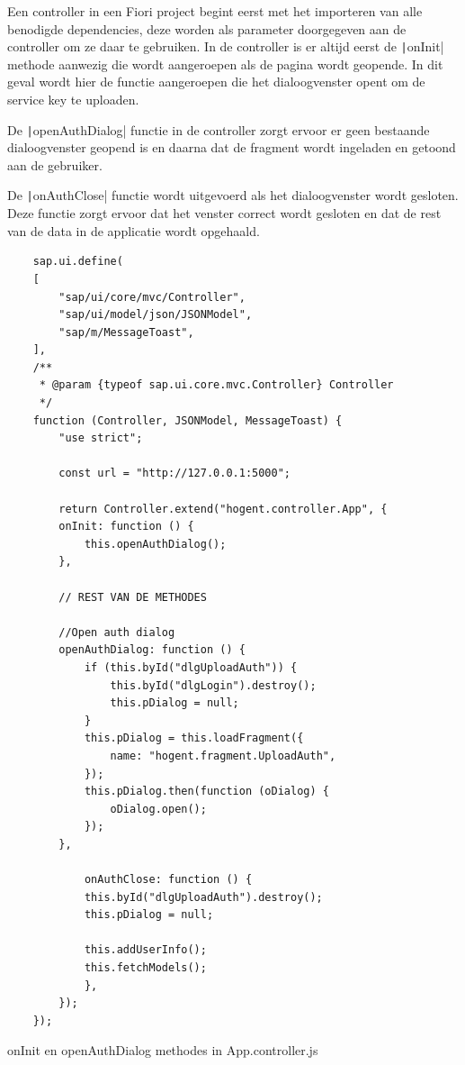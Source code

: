 Een controller in een Fiori project begint eerst met het importeren van alle benodigde dependencies, deze worden als parameter doorgegeven aan de controller om ze daar te gebruiken. In de controller is er altijd eerst de \texttt|onInit| methode aanwezig die wordt aangeroepen als de pagina wordt geopende. In dit geval wordt hier de functie aangeroepen die het dialoogvenster opent om de service key te uploaden.

De \texttt|openAuthDialog| functie in de controller zorgt ervoor er geen bestaande dialoogvenster geopend is en daarna dat de fragment wordt ingeladen en getoond aan de gebruiker. 

De \texttt|onAuthClose| functie wordt uitgevoerd als het dialoogvenster wordt gesloten. Deze functie zorgt ervoor dat het venster correct wordt gesloten en dat de rest van de data in de applicatie wordt opgehaald.

\begin{listing}[H]
\begin{verbatim}
    sap.ui.define(
    [
        "sap/ui/core/mvc/Controller",
        "sap/ui/model/json/JSONModel",
        "sap/m/MessageToast",
    ],
    /**
     * @param {typeof sap.ui.core.mvc.Controller} Controller
     */
    function (Controller, JSONModel, MessageToast) {
        "use strict";

        const url = "http://127.0.0.1:5000";

        return Controller.extend("hogent.controller.App", {
        onInit: function () {
            this.openAuthDialog();
        },
        
        // REST VAN DE METHODES

        //Open auth dialog
        openAuthDialog: function () {
            if (this.byId("dlgUploadAuth")) {
                this.byId("dlgLogin").destroy();
                this.pDialog = null;
            }
            this.pDialog = this.loadFragment({
                name: "hogent.fragment.UploadAuth",
            });
            this.pDialog.then(function (oDialog) {
                oDialog.open();
            });
        },

            onAuthClose: function () {
            this.byId("dlgUploadAuth").destroy();
            this.pDialog = null;

            this.addUserInfo();
            this.fetchModels();
            },
        });
    });
\end{verbatim}
\caption{onInit en openAuthDialog methodes in App.controller.js}
\end{listing}


